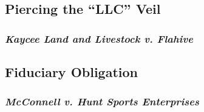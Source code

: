 \subsection{Piercing the ``LLC'' Veil}

\subsubsection{\emph{Kaycee Land and Livestock v. Flahive}}


\subsection{Fiduciary Obligation}

\subsubsection{\emph{McConnell v. Hunt Sports Enterprises}}


